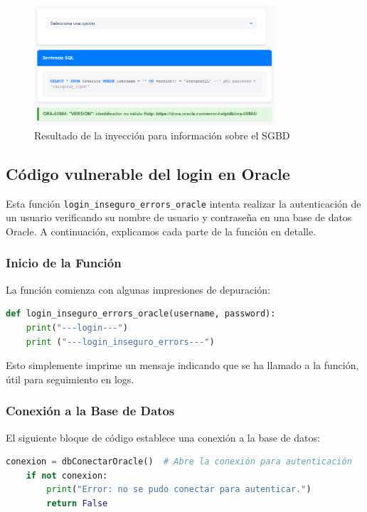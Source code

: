 \documentclass[a4paper,12pt]{article}
\begin{document}
\begin{figure}[H]
    \centering
    \includegraphics[width=0.8\textwidth]{Imagenes/error10.png}
    \caption{Resultado de la inyección para información sobre el SGBD}
\end{figure}

\subsection{Código vulnerable del login en Oracle}
Esta función \texttt{login\_inseguro\_errors\_oracle} intenta realizar la autenticación de un usuario verificando su nombre de usuario y contraseña en una base de datos Oracle. A continuación, explicamos cada parte de la función en detalle.

\subsubsection{Inicio de la Función}
La función comienza con algunas impresiones de depuración:

\begin{lstlisting}[language=Python]
def login_inseguro_errors_oracle(username, password):
    print("---login---")
    print ("---login_inseguro_errors---")
\end{lstlisting}

Esto simplemente imprime un mensaje indicando que se ha llamado a la función, útil para seguimiento en logs.

\subsubsection{Conexión a la Base de Datos}
El siguiente bloque de código establece una conexión a la base de datos:

\begin{lstlisting}[language=Python]
    conexion = dbConectarOracle()  # Abre la conexión para autenticación
    if not conexion:
        print("Error: no se pudo conectar para autenticar.")
        return False
\end{lstlisting}
\end{document}
